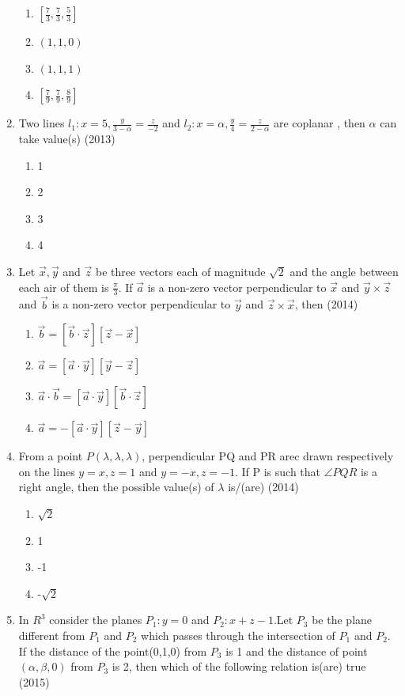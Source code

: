 \documentclass[12pt]{article}
\providecommand{\brak}[1]{\ensuremath{\left(#1\right)}}
\providecommand{\sbrak}[1]{\ensuremath{{}\left[#1\right]}}
\begin{document}
\begin{enumerate}
\begin{enumerate}
\item $\sbrak{\frac{7}{3},\frac{7}{3},\frac{5}{3}}$
\item $\brak{1,1,0}$
\item $\brak{1,1,1}$
\item $\sbrak{\frac{7}{9},\frac{7}{9},\frac{8}{9}}$
\end{enumerate}
\item Two lines $l_1: x=5,\frac{y}{3-\alpha}=\frac{z}{-2}$ and $l_2: x=\alpha,\frac{y}{4}=\frac{z}{2-\alpha}$ are coplanar , then $\alpha$ can take value(s) (2013)
\begin{enumerate}
\item 1
\item 2 
\item 3
\item 4
\end{enumerate}
\item Let $\vec{x},\vec{y}$ and $\vec{z}$ be three vectors each of magnitude $\sqrt{2}$
 and the angle between each air of them is $\frac{\pi}{3}$. If $\vec{a}$ is a non-zero vector perpendicular to $\vec{x}$ and $\vec{y}\times \vec{z}$ and $\vec{b}$ is a non-zero vector perpendicular to $\vec{y}$ and $\vec{z}\times \vec{x}$, then (2014)
\begin{enumerate}
\item  $\vec{b}=\sbrak{\vec{b} \cdot \vec{z}}\sbrak{\vec{z}-\vec{x}}$
\item  $\vec{a}=\sbrak{\vec{a} \cdot \vec{y}}\sbrak{\vec{y}-\vec{z}}$
\item  $\vec{a}\cdot\vec{b}=\sbrak{\vec{a} \cdot \vec{y}}\sbrak{\vec{b}\cdot\vec{z}}$
\item  $\vec{a}=-\sbrak{\vec{a} \cdot \vec{y}}\sbrak{\vec{z}-\vec{y}}$
\end{enumerate}
\item From a point $P(\lambda,\lambda,\lambda)$, perpendicular PQ and PR arec drawn respectively on the lines $y=x,z=1$ and $y=-x,z=-1$. If P is such that $\angle PQR$ is a right angle, then the possible value(s) of $\lambda$ is/(are) (2014)
\begin{enumerate}
\item $\sqrt{2}$
\item 1 
\item -1 
\item -$\sqrt{2}$
\end{enumerate}
\item In $R^3$ consider the planes $P_1:y=0$ and $P_2:x+z-1$.Let $P_3$ be the plane different from $P_1$ and $P_2$ which passes through the intersection of $P_1$ and $P_2$. If the distance of the point(0,1,0) from $P_3$ is 1 and the distance of point $(\alpha,\beta,0)$ from $P_3$ is 2,  then which of the following relation is(are) true  (2015)

\end{enumerate}
\end{document}
